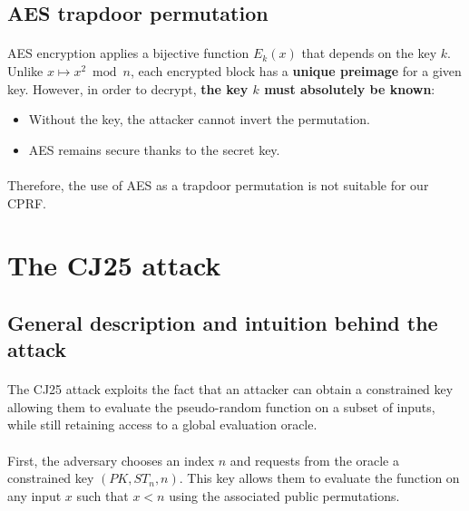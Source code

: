\documentclass[9pt]{extarticle}
\begin{document}
\subsection{AES trapdoor permutation}
\paragraph{}
AES encryption applies a bijective function \(E_k(x)\) that depends on the key \(k\).
Unlike \(x \mapsto x^2 \bmod n\), each encrypted block has a \textbf{unique preimage} for a given key.
However, in order to decrypt, \textbf{the key \(k\) must absolutely be known}:
\begin{itemize}
    \item Without the key, the attacker cannot invert the permutation.
    \item AES remains secure thanks to the secret key.
\end{itemize}

\paragraph{}
Therefore, the use of AES as a trapdoor permutation is not suitable for our CPRF.


\section{The CJ25 attack}

\subsection{General description and intuition behind the attack}

\paragraph{}
The CJ25 attack exploits the fact that an attacker can obtain a constrained key
allowing them to evaluate the pseudo-random function on a subset of inputs,
while still retaining access to a global evaluation oracle.

\paragraph{}
First, the adversary chooses an index $n$ and requests from the oracle a
constrained key $(PK, ST_n, n)$. This key allows them to evaluate the function on any
input $x$ such that $x < n$ using the associated public permutations.
\end{document}
